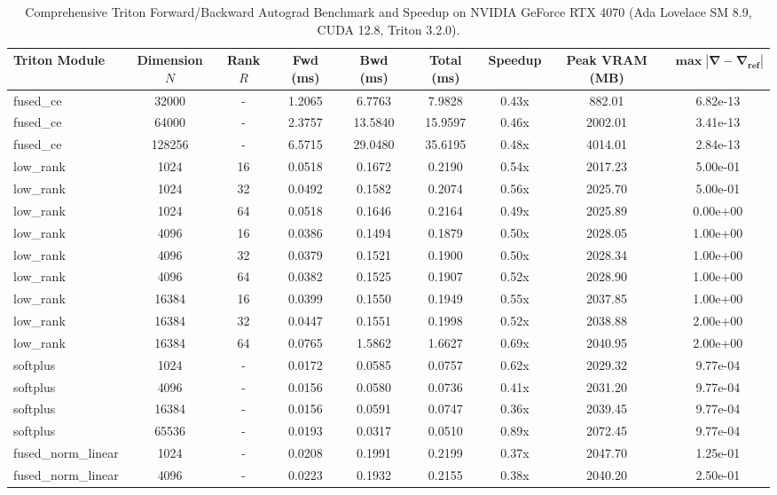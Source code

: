 \documentclass[journal]{IEEEtran}
\begin{document}
\begin{table}[t]
\centering
\small
\begin{tabular}{lcccccccc}
\toprule
\textbf{Triton Module} & \textbf{Dimension $N$} & \textbf{Rank $R$} & \textbf{Fwd (ms)} & \textbf{Bwd (ms)} & \textbf{Total (ms)} & \textbf{Speedup} & \textbf{Peak VRAM (MB)} & $\mathbf{\max |\nabla - \nabla_{\text{ref}}|}$ \\
\midrule
fused\_ce & 32000 & - & 1.2065 & 6.7763 & 7.9828 & 0.43x & 882.01 & 6.82e-13 \\
fused\_ce & 64000 & - & 2.3757 & 13.5840 & 15.9597 & 0.46x & 2002.01 & 3.41e-13 \\
fused\_ce & 128256 & - & 6.5715 & 29.0480 & 35.6195 & 0.48x & 4014.01 & 2.84e-13 \\
low\_rank & 1024 & 16 & 0.0518 & 0.1672 & 0.2190 & 0.54x & 2017.23 & 5.00e-01 \\
low\_rank & 1024 & 32 & 0.0492 & 0.1582 & 0.2074 & 0.56x & 2025.70 & 5.00e-01 \\
low\_rank & 1024 & 64 & 0.0518 & 0.1646 & 0.2164 & 0.49x & 2025.89 & 0.00e+00 \\
low\_rank & 4096 & 16 & 0.0386 & 0.1494 & 0.1879 & 0.50x & 2028.05 & 1.00e+00 \\
low\_rank & 4096 & 32 & 0.0379 & 0.1521 & 0.1900 & 0.50x & 2028.34 & 1.00e+00 \\
low\_rank & 4096 & 64 & 0.0382 & 0.1525 & 0.1907 & 0.52x & 2028.90 & 1.00e+00 \\
low\_rank & 16384 & 16 & 0.0399 & 0.1550 & 0.1949 & 0.55x & 2037.85 & 1.00e+00 \\
low\_rank & 16384 & 32 & 0.0447 & 0.1551 & 0.1998 & 0.52x & 2038.88 & 2.00e+00 \\
low\_rank & 16384 & 64 & 0.0765 & 1.5862 & 1.6627 & 0.69x & 2040.95 & 2.00e+00 \\
softplus & 1024 & - & 0.0172 & 0.0585 & 0.0757 & 0.62x & 2029.32 & 9.77e-04 \\
softplus & 4096 & - & 0.0156 & 0.0580 & 0.0736 & 0.41x & 2031.20 & 9.77e-04 \\
softplus & 16384 & - & 0.0156 & 0.0591 & 0.0747 & 0.36x & 2039.45 & 9.77e-04 \\
softplus & 65536 & - & 0.0193 & 0.0317 & 0.0510 & 0.89x & 2072.45 & 9.77e-04 \\
fused\_norm\_linear & 1024 & - & 0.0208 & 0.1991 & 0.2199 & 0.37x & 2047.70 & 1.25e-01 \\
fused\_norm\_linear & 4096 & - & 0.0223 & 0.1932 & 0.2155 & 0.38x & 2040.20 & 2.50e-01 \\
\bottomrule
\end{tabular}
\caption{Comprehensive Triton Forward/Backward Autograd Benchmark and Speedup on NVIDIA GeForce RTX 4070 (Ada Lovelace SM 8.9, CUDA 12.8, Triton 3.2.0).}
\label{tab:triton_gemm_benchmarks}
\end{table}
\end{document}
